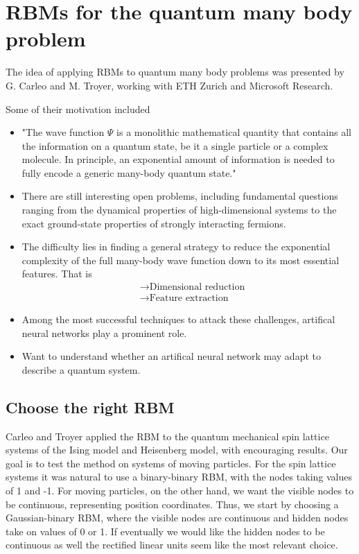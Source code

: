 \documentclass[norsk,a4paper,11pt]{beamer}
\begin{document}
\section{RBMs for the quantum many body problem}
\begin{frame}
The idea of applying RBMs to quantum many body problems was presented by G. Carleo and M. Troyer, working with ETH Zurich and Microsoft Research.

Some of their motivation included
\begin{itemize}
	\item "The wave function $\Psi$ is a monolithic mathematical quantity that contains all the information on a quantum state, be it a single particle or a complex molecule. In principle, an exponential amount of information is needed to fully encode a generic many-body quantum state."
	\item There are still interesting open problems, including fundamental questions ranging from the dynamical properties of high-dimensional systems to the exact ground-state properties of strongly interacting fermions.
\end{itemize}
\end{frame}

\begin{frame}
\begin{itemize}
	\item The difficulty lies in finding a general strategy to reduce the exponential complexity of the full many-body wave function down to its most essential features. That is
	\begin{align}
		&\rightarrow \text{Dimensional reduction} \\
		&\rightarrow \text{Feature extraction}
	\end{align}
	\item Among the most successful techniques to attack these challenges, artifical neural networks play a prominent role.
	\item Want to understand whether an artifical neural network may adapt to describe a quantum system.
\end{itemize}
\end{frame}

\begin{frame}
\subsection{Choose the right RBM}
Carleo and Troyer applied the RBM to the quantum mechanical spin lattice systems of the Ising model and Heisenberg model, with encouraging results. Our goal is to test the method on systems of moving particles. For the spin lattice systems it was natural to use a binary-binary RBM, with the nodes taking values of 1 and -1. For moving particles, on the other hand, we want the visible nodes to be continuous, representing position coordinates. Thus, we start by choosing a Gaussian-binary RBM, where the visible nodes are continuous and hidden nodes take on values of 0 or 1. If eventually we would like the hidden nodes to be continuous as well the rectified linear units seem like the most relevant choice.
\end{frame}
\end{document}
